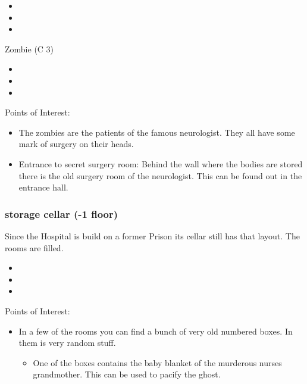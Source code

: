 \documentclass[11pt]{article}
\begin{document}
{\begin{itemize}
\item {}
\item {}
\item {}
\end{itemize}

Zombie (C 3)
\begin{itemize}
\item {}
\item {}
\item {}
\end{itemize}

Points of Interest:
\begin{itemize}
\item The zombies are the patients of the famous neurologist. They all have some mark of surgery on their heads.
\item Entrance to secret surgery room: Behind the wall where the bodies are stored there is the old surgery room of the neurologist. This can be found out in the entrance hall.
\end{itemize}
\subsubsection{storage cellar (-1 floor)}
\label{sec:org35824ee}
Since the Hospital is build on a former Prison its cellar still has that layout. The rooms are filled.

\begin{itemize}
\item {}
\item {}
\item {}
\end{itemize}

Points of Interest:
\begin{itemize}
\item In a few of the rooms you can find a bunch of very old numbered boxes. In them is very random stuff.
\begin{itemize}
\item One of the boxes contains the baby blanket of the murderous nurses grandmother. This can be used to pacify the ghost.
\end{itemize}
\end{itemize}


}
\end{document}
